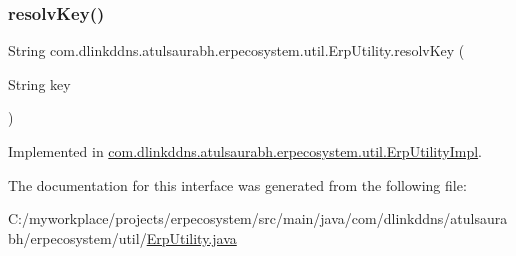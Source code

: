 \subsubsection{\texorpdfstring{resolv\+Key()}{resolvKey()}}
{\footnotesize\ttfamily String com.\+dlinkddns.\+atulsaurabh.\+erpecosystem.\+util.\+Erp\+Utility.\+resolv\+Key (\begin{DoxyParamCaption}\item[{String}]{key }\end{DoxyParamCaption})}



Implemented in \mbox{\hyperlink{classcom_1_1dlinkddns_1_1atulsaurabh_1_1erpecosystem_1_1util_1_1_erp_utility_impl_af2cfed2c5aca189be0e160b0610f2644}{com.\+dlinkddns.\+atulsaurabh.\+erpecosystem.\+util.\+Erp\+Utility\+Impl}}.



The documentation for this interface was generated from the following file\+:\begin{DoxyCompactItemize}
\item 
C\+:/myworkplace/projects/erpecosystem/src/main/java/com/dlinkddns/atulsaurabh/erpecosystem/util/\mbox{\hyperlink{_erp_utility_8java}{Erp\+Utility.\+java}}\end{DoxyCompactItemize}
